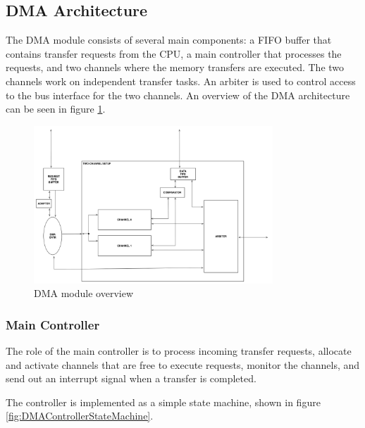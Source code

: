 \subsection{DMA Architecture}
The DMA module consists of several main components: a FIFO buffer that contains transfer
requests from the CPU, a main controller that processes the requests, and two channels
where the memory transfers are executed. The two channels work on independent transfer
tasks. An arbiter is used to control access to the bus interface for the two channels.
An overview of the DMA architecture can be seen in figure \ref{fig:DMATopView}.

\begin{figure}[htb]
    \centering
    \includegraphics[width=0.8\textwidth]{Figures/DMA/TopViewFinalSimple}
    \caption{DMA module overview}
    \label{fig:DMATopView}
\end{figure}

\subsubsection{Main Controller}
The role of the main controller is to process incoming transfer requests, allocate and activate
channels that are free to execute requests, monitor the channels, and send out an interrupt signal
when a transfer is completed. 

The controller is implemented as a simple state machine, shown in figure \ref{fig:DMAControllerStateMachine}.

